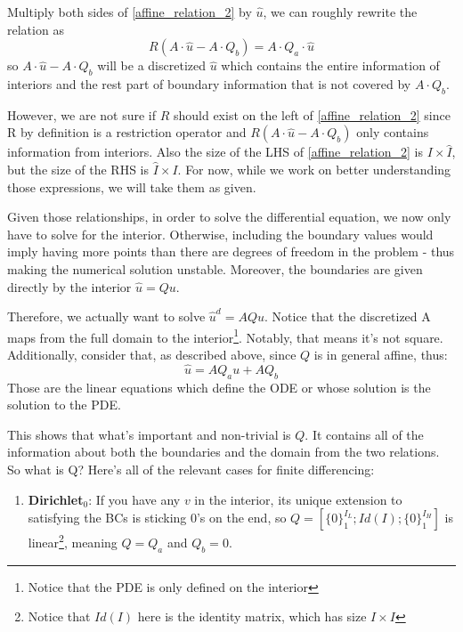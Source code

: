 \documentclass[11pt]{article}
\begin{document}
\begin{itemize}
		Multiply both sides of \eqref{affine_relation_2} by $\hat{u}$, we can roughly rewrite the relation as
		\begin{equation}
		R(A\cdot \hat{u}-A\cdot Q_b) = A\cdot Q_a\cdot \hat{u}
		\end{equation}
		so $A\cdot \hat{u}-A\cdot Q_b$ will be a discretized $\hat{u}$ which contains the entire information of interiors and the rest part of boundary information that is not covered by $A\cdot Q_b$. 
		
		However, we are not sure if $R$ should exist on the left of \eqref{affine_relation_2} since R by definition is a restriction operator and $R(A\cdot \hat{u}-A\cdot Q_b)$ only contains information from interiors. Also the size of the LHS of \eqref{affine_relation_2} is $I\times \hat{I}$, but the size of the RHS is $\hat{I}\times I$.
		For now, while we work on better understanding those expressions, we will take them as given.
		
		
		Given those relationships, in order to solve the differential equation, we now only have to solve for the interior. Otherwise, including the boundary values would imply having more points than there are degrees of freedom in the problem - thus making the numerical solution unstable. Moreover, the boundaries are given directly by the interior $\hat{u} = Qu$. 
		
		Therefore, we actually want to solve $\hat{u}^d = AQu$. Notice that the discretized A maps from the full domain to the interior\footnote{Notice that the PDE is only defined on the interior}. Notably, that means it's not square. Additionally, consider that, as described above, since $Q$ is in general affine, thus:
		\begin{equation}
		\hat{u} = AQ_au + AQ_b
		\end{equation}
	Those are the linear equations which define the ODE or whose solution is the solution to the PDE.
		
	This shows that what's important and non-trivial is $Q$. It contains all of the information about both the boundaries and the domain from the two relations. So what is Q? Here's all of the relevant cases for finite differencing:
	\begin{enumerate}
	\item \textbf{Dirichlet$_0$}: If you have any $v$ in the interior, its unique extension to satisfying the BCs is 
			sticking $0$'s on the end, so $Q = [\{0\}_1^{I_L};Id(I); \{0\}_1^{I_H}]$ is linear\footnote{Notice that $Id(I)$ here is the identity matrix, which has size $I\times I$}, meaning $Q = Q_a$ and $Q_b=0$.
			

\end{enumerate}
\end{itemize}
\end{document}
